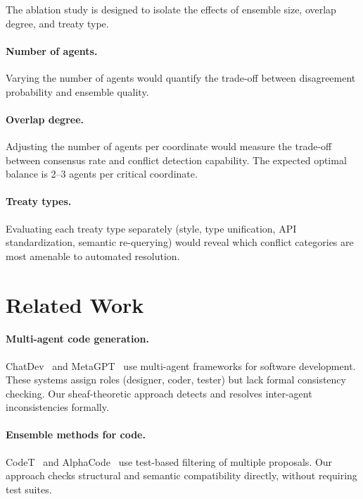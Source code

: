 \documentclass[11pt]{article}
\begin{document}
The ablation study is designed to isolate the effects of ensemble
size, overlap degree, and treaty type.

\paragraph{Number of agents.}
Varying the number of agents would quantify the trade-off between
disagreement probability and ensemble quality.

\paragraph{Overlap degree.}
Adjusting the number of agents per coordinate would measure the
trade-off between consensus rate and conflict detection capability.
The expected optimal balance is 2--3 agents per critical coordinate.

\paragraph{Treaty types.}
Evaluating each treaty type separately (style, type unification, API
standardization, semantic re-querying) would reveal which conflict
categories are most amenable to automated resolution.


\section{Related Work}\label{sec:related}

\paragraph{Multi-agent code generation.}
ChatDev~\cite{Qian2023} and MetaGPT~\cite{Hong2023} use multi-agent
frameworks for software development.  These systems assign roles
(designer, coder, tester) but lack formal consistency checking.  Our
sheaf-theoretic approach detects and resolves inter-agent
inconsistencies formally.

\paragraph{Ensemble methods for code.}
CodeT~\cite{Chen2023} and AlphaCode~\cite{Li2022} use test-based
filtering of multiple proposals.  Our approach checks structural and
semantic compatibility directly, without requiring test suites.
\end{document}
